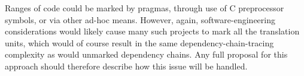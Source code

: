 Ranges of code could be marked by pragmas, through use of C preprocessor
symbols, or via other ad-hoc means.
However, again, software-engineering considerations would likely cause
many such projects to mark all the translation units, which would of course
result in the same dependency-chain-tracing complexity as would unmarked
dependency chains.
Any full proposal for this approach should therefore describe how this
issue will be handled.
